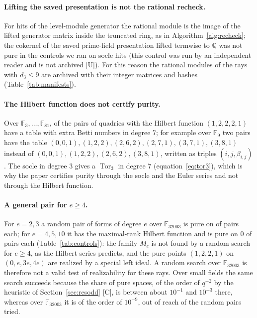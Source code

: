 \documentclass[11pt]{article}
\theoremstyle{definition}
\theoremstyle{remark}
\newcommand{\Q}{\mathbb{Q}}
\newcommand{\F}{\mathbb{F}}
\newcommand{\Tor}{\operatorname{Tor}}
\begin{document}
\paragraph{Lifting the saved presentation is not the rational recheck.} For hits of the level-module generator the rational module is the image of the lifted generator matrix inside the truncated ring, as in Algorithm~\ref{alg:recheck}; the cokernel of the saved prime-field presentation lifted termwise to $\Q$ was not pure in the controls we ran on socle hits (this control was run by an independent reader and is not archived [U]). For this reason the rational modules of the rays with $d_3\le9$ are archived with their integer matrices and hashes (Table~\ref{tab:manifests}).

\paragraph{The Hilbert function does not certify purity.} Over $\F_3,\dots,\F_{81}$, \npairsRightHFWrongTable{} of the \npairsRightHF{} pairs of quadrics with the Hilbert function $(1,2,2,2,1)$ have a table with extra Betti numbers in degree $7$; for example over $\F_9$ two pairs have the table $(0,0,1),(1,2,2),(2,6,2),(2,7,1),(3,7,1),(3,8,1)$ instead of $(0,0,1),(1,2,2),(2,6,2),(3,8,1)$, written as triples $(i,j,\beta_{i,j})$. The socle in degree $3$ gives a $\Tor_3$ in degree $7$ (equation~\eqref{eq:tor3}), which is why the paper certifies purity through the socle and the Euler series and not through the Hilbert function.

\paragraph{A general pair for $e\ge4$.} For $e=2,3$ a random pair of forms of degree $e$ over $\F_{32003}$ is pure on \ngeneralPureTwoThree{} of \ngeneralPairs{} pairs each; for $e=4,5,10$ it has the maximal-rank Hilbert function and is pure on $0$ of \ngeneralPairs{} pairs each (Table~\ref{tab:controls}): the family $M_e$ is not found by a random search for $e\ge4$, as the Hilbert series predicts, and the pure points $(1,2,2,1)$ on $(0,e,3e,4e)$ are realized by a special left ideal. A random search over $\F_{32003}$ is therefore not a valid test of realizability for these rays. Over small fields the same search succeeds because the share of pure spaces, of the order of $q^{-2}$ by the heuristic of Section~\ref{sec:resodd} [C], is between about $10^{-1}$ and $10^{-3}$ there, whereas over $\F_{32003}$ it is of the order of $10^{-9}$, out of reach of the \ngeneralPairs{} random pairs tried.
\end{document}
